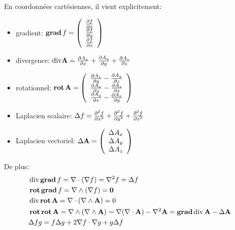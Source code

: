 \ifVersionDuDocEstVincent\medskip\fi
En coordonnées cartésiennes, il vient explicitement:
\begin{itemize}
   \item gradient: $ \operatorname{\mathbf{grad}}  f=
	\left( \begin{array}{c} {\partial f \over \partial x}\\ {\partial f \over \partial y}\\ {\partial f \over \partial z}
	\end{array}\right)$
   \item divergence: $ \mathrm{div} \mathbf{A}  =
	{\partial A_x \over \partial x} + {\partial A_y \over \partial y} + {\partial A_z \over \partial z}$
   \item rotationnel: $ \operatorname{\mathbf{rot}}  {\mathbf{A} } =
	\left( \begin{array}{c} {\partial A_z \over \partial y} - {\partial A_y \over \partial z} \\
	{\partial A_x \over \partial z} - {\partial A_z \over \partial x} \\
	{\partial A_y \over \partial x} - {\partial A_x \over \partial y}
	\end{array}\right)$
   \item Laplacien scalaire: $\Delta f  ={\partial^2 f \over \partial x^2} + {\partial^2 f \over \partial y^2} + {\partial^2 f \over \partial z^2}$
   \item Laplacien vectoriel: $\Delta \mathbf{A}  =
	\left( \begin{array}{c} \Delta A_x \\ \Delta A_y \\ \Delta A_z
	\end{array}\right)$
\end{itemize}

\ifVersionDuDocEstVincent\medskip\fi
De plus:
\begin{align}
&\dive \gradb f = \nabla \cdot (\nabla f) = \nabla^2 f = \Delta f\\
&\rotb\gradb f = \nabla \wedge ( \nabla f)
\colorred = \boldsymbol 0\\
&\dive\rotb \mathbf{A}  = \nabla \cdot ( \nabla \wedge \mathbf{A} ) \colorred = 0\\
&\rotb\rotb\mathbf{A}  = \nabla \wedge (\nabla \wedge \mathbf{A} ) =\nabla ( \nabla \cdot \mathbf{A} ) - \nabla^2 \mathbf{A}  = \gradb\dive \mathbf{A}  - \Delta \mathbf{A} \\
&\Delta f g = f \Delta g + 2 \nabla f \cdot \nabla g + g \Delta f
\end{align}

